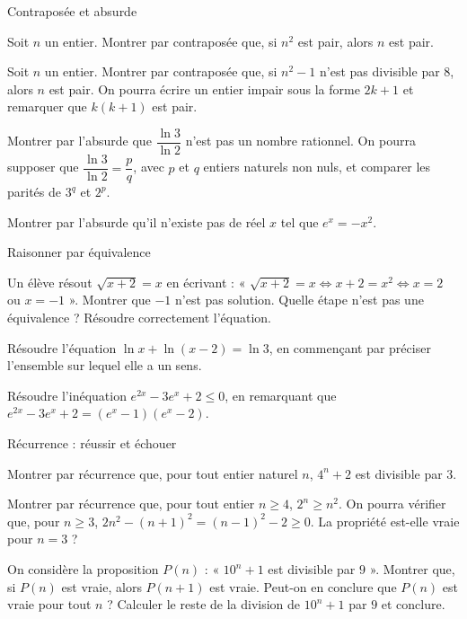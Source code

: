 \begin{exercice}[2]{Contraposée et absurde}
\begin{questions}
  \item Soit $n$ un entier. Montrer par contraposée que, si $n^{2}$ est pair, alors $n$ est pair.
  \item Soit $n$ un entier. Montrer par contraposée que, si $n^{2}-1$ n'est pas divisible par $8$, alors $n$ est pair. On
    pourra écrire un entier impair sous la forme $2k+1$ et remarquer que $k(k+1)$ est pair.
  \item Montrer par l'absurde que $\dfrac{\ln3}{\ln2}$ n'est pas un nombre rationnel. On pourra supposer que
    $\dfrac{\ln3}{\ln2}=\dfrac pq$, avec $p$ et $q$ entiers naturels non nuls, et comparer les parités de $3^{q}$ et $2^{p}$.
  \item Montrer par l'absurde qu'il n'existe pas de réel $x$ tel que $e^{x}=-x^{2}$.
\end{questions}
\end{exercice}

\begin{exercice}[2]{Raisonner par équivalence}
\begin{questions}
  \item Un élève résout $\sqrt{x+2}=x$ en écrivant : « $\sqrt{x+2}=x\iff x+2=x^{2}\iff x=2$ ou $x=-1$ ». Montrer que $-1$
    n'est pas solution. Quelle étape n'est pas une équivalence ? Résoudre correctement l'équation.
  \item Résoudre l'équation $\ln x+\ln(x-2)=\ln3$, en commençant par préciser l'ensemble sur lequel elle a un sens.
  \item Résoudre l'inéquation $e^{2x}-3e^{x}+2\leq0$, en remarquant que $e^{2x}-3e^{x}+2=\left(e^{x}-1\right)\left(e^{x}-2\right)$.
\end{questions}
\end{exercice}

\begin{exercice}[2]{Récurrence : réussir et échouer}
\begin{questions}
  \item Montrer par récurrence que, pour tout entier naturel $n$, $4^{n}+2$ est divisible par $3$.
  \item Montrer par récurrence que, pour tout entier $n\geq4$, $2^{n}\geq n^{2}$. On pourra vérifier que, pour $n\geq3$,
    $2n^{2}-(n+1)^{2}=(n-1)^{2}-2\geq0$. La propriété est-elle vraie pour $n=3$ ?
  \item On considère la proposition $P(n)$ : « $10^{n}+1$ est divisible par $9$ ». Montrer que, si $P(n)$ est vraie, alors
    $P(n+1)$ est vraie. Peut-on en conclure que $P(n)$ est vraie pour tout $n$ ? Calculer le reste de la division de $10^{n}+1$
    par $9$ et conclure.
\end{questions}
\end{exercice}

